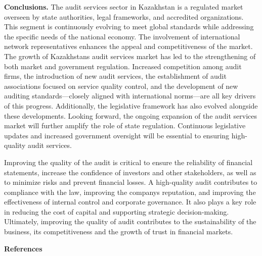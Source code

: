 \begin{multicols}{2}
\textbf{Conclusions.} The audit services sector in Kazakhstan is a
regulated market overseen by state authorities, legal frameworks, and
accredited organizations. This segment is continuously evolving to meet
global standards while addressing the specific needs of the national
economy. The involvement of international network representatives
enhances the appeal and competitiveness of the market. The growth of
Kazakhstan\textquotesingle s audit services market has led to the
strengthening of both market and government regulation. Increased
competition among audit firms, the introduction of new audit services,
the establishment of audit associations focused on service quality
control, and the development of new auditing standards---closely aligned
with international norms---are all key drivers of this progress.
Additionally, the legislative framework has also evolved alongside these
developments. Looking forward, the ongoing expansion of the audit
services market will further amplify the role of state regulation.
Continuous legislative updates and increased government oversight will
be essential to ensuring high-quality audit services.

Improving the quality of the audit is critical to ensure the reliability
of financial statements, increase the confidence of investors and other
stakeholders, as well as to minimize risks and prevent financial losses.
A high-quality audit contributes to compliance with the law, improving
the company\textquotesingle s reputation, and improving the
effectiveness of internal control and corporate governance. It also
plays a key role in reducing the cost of capital and supporting
strategic decision-making. Ultimately, improving the quality of audit
contributes to the sustainability of the business, its competitiveness
and the growth of trust in financial markets.
\end{multicols}

\begin{center}
  {\bfseries References}
  \end{center}
  
